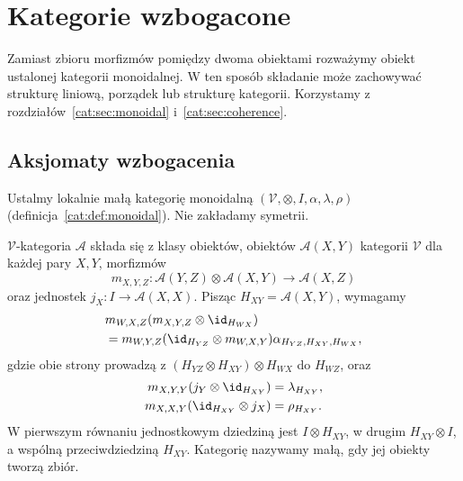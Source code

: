 \section{Kategorie wzbogacone}\label{cat:sec:enriched}

Zamiast zbioru morfizmów pomiędzy dwoma obiektami rozważymy obiekt ustalonej kategorii monoidalnej. W ten sposób składanie może zachowywać strukturę liniową, porządek lub strukturę kategorii. Korzystamy z rozdziałów~\ref{cat:sec:monoidal} i~\ref{cat:sec:coherence}.

\subsection{Aksjomaty wzbogacenia}

Ustalmy lokalnie małą kategorię monoidalną $(\mathcal V,\otimes,I,\alpha,\lambda,\rho)$ (definicja~\ref{cat:def:monoidal}). Nie zakładamy symetrii.

\begin{definicja}\label{cat:def:enriched-category}
$\mathcal V$-kategoria $\mathcal A$ składa się z klasy obiektów, obiektów $\mathcal A(X,Y)$ kategorii $\mathcal V$ dla każdej pary $X,Y$, morfizmów
\[
 m_{X,Y,Z}:\mathcal A(Y,Z)\otimes\mathcal A(X,Y)\to\mathcal A(X,Z)
\]
oraz jednostek $j_X:I\to\mathcal A(X,X)$. Pisząc $H_{XY}=\mathcal A(X,Y)$, wymagamy
\begin{equation}\label{cat:eq:enriched-assoc}
\begin{aligned}
&m_{W,X,Z}(m_{X,Y,Z}\otimes\id_{H_{WX}})\\
&=m_{W,Y,Z}(\id_{H_{YZ}}\otimes m_{W,X,Y})
  \alpha_{H_{YZ},H_{XY},H_{WX}},
\end{aligned}
\end{equation}
gdzie obie strony prowadzą z $(H_{YZ}\otimes H_{XY})\otimes H_{WX}$ do $H_{WZ}$, oraz
\begin{equation}\label{cat:eq:enriched-unit}
\begin{aligned}
 m_{X,Y,Y}(j_Y\otimes\id_{H_{XY}})&=\lambda_{H_{XY}},\\
 m_{X,X,Y}(\id_{H_{XY}}\otimes j_X)&=\rho_{H_{XY}}.
\end{aligned}
\end{equation}
W pierwszym równaniu jednostkowym dziedziną jest $I\otimes H_{XY}$, w drugim $H_{XY}\otimes I$, a wspólną przeciwdziedziną $H_{XY}$. Kategorię nazywamy małą, gdy jej obiekty tworzą zbiór.
\end{definicja}

